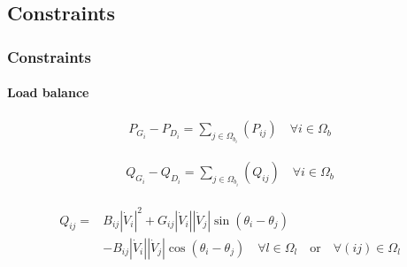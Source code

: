 \documentclass[
	11pt, %
	aspectratio=169, %
]{beamer}
\begin{document}

\subsection{Constraints}

\begin{frame}
	\frametitle{Constraints}
	\label{frame:constraints}
	\framesubtitle{Load balance} %

	\begin{align}
	\label{eq:cons_load_bal_P}
		P_{G_{i}} - P_{D_{i}} = \sum_{j \in \Omega_{b_{i}}}(P_{ij})  \quad \forall i \in \Omega_{b}
	\end{align}

	\begin{align}
	\label{eq:cons_load_bal_Q}
		Q_{G_{i}} - Q_{D_{i}} = \sum_{j \in \Omega_{b_{i}}}(Q_{ij})  \quad \forall i \in \Omega_{b}
	\end{align}

	\begin{align}
	\label{eq:expr_q_flow_ij}
		\begin{split}
			Q_{ij}=&B_{ij}\left\lvert \dot{V}_{i}\right\rvert^{2} + G_{ij}\left\lvert \dot{V}_{i}\right\rvert\left\lvert \dot{V}_{j}\right\rvert \sin{\left(\theta_{i}-\theta_{j}\right)} \\
			&- B_{ij}\left\lvert \dot{V}_{i}\right\rvert\left\lvert \dot{V}_{j}\right\rvert \cos{\left(\theta_{i}-\theta_{j}\right)}  \quad   \forall l \in \Omega_{l} \quad \text{or} \quad \forall (ij) \in \Omega_{l}
		\end{split}
	\end{align}

	
\end{frame}

\end{document}
